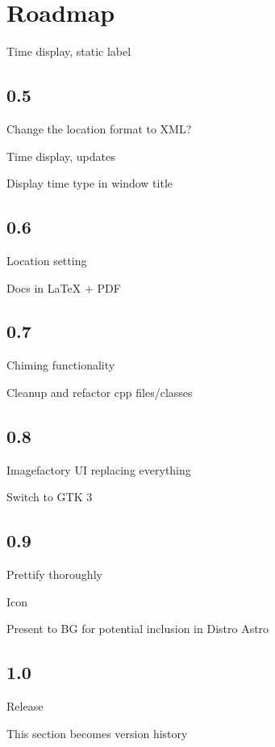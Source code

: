 \section{Roadmap}

Time display, static label

\subsection{0.5}

Change the location format to XML?

Time display, updates

Display time type in window title


\subsection{0.6}

Location setting

Docs in LaTeX + PDF

\subsection{0.7}

Chiming functionality

Cleanup and refactor cpp files/classes

\subsection{0.8}

Imagefactory UI replacing everything

Switch to GTK 3

\subsection{0.9}

Prettify thoroughly

Icon

Present to BG for potential inclusion in Distro Astro

\subsection{1.0}

Release

This section becomes version history

